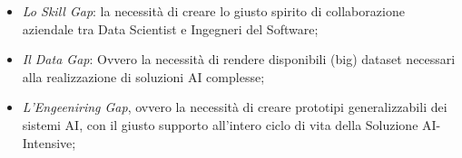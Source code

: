 \begin{itemize}
    \item \emph{Lo Skill Gap}: la necessità di creare lo giusto spirito di collaborazione aziendale tra Data Scientist e Ingegneri del Software;
    \item \emph{Il Data Gap}: Ovvero la necessità di rendere disponibili (big) dataset necessari alla realizzazione di soluzioni AI complesse;
    \item \emph{L'Engeeniring Gap}, ovvero la necessità di creare prototipi generalizzabili dei sistemi AI, con il giusto supporto all'intero ciclo di vita della Soluzione AI-Intensive;
\end{itemize}

\newpage